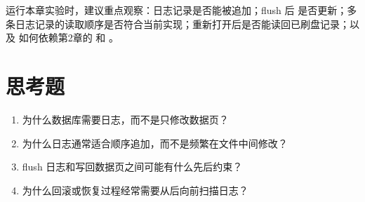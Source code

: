 运行本章实验时，建议重点观察：日志记录是否能被追加；flush 后  是否更新；多条日志记录的读取顺序是否符合当前实现；重新打开后是否能读回已刷盘记录；以及  如何依赖第2章的  和 。

\section{思考题}
\label{sec:log-questions}

\begin{enumerate}
  \item 为什么数据库需要日志，而不是只修改数据页？
  \item 为什么日志通常适合顺序追加，而不是频繁在文件中间修改？
  \item flush 日志和写回数据页之间可能有什么先后约束？
  \item 为什么回滚或恢复过程经常需要从后向前扫描日志？
\end{enumerate}
